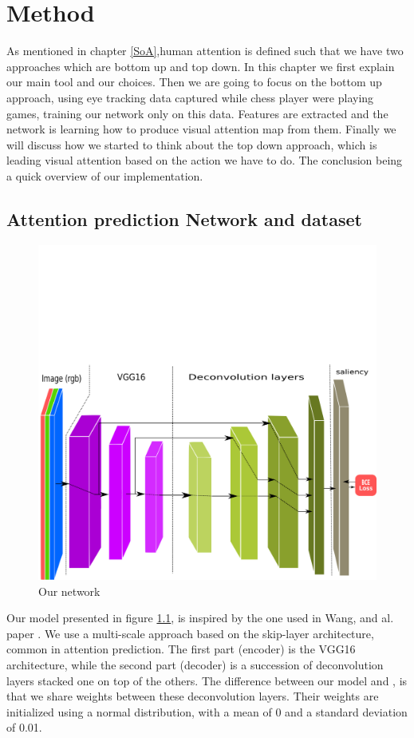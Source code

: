 \chapter{Method}
As mentioned in chapter \ref{SoA},human attention is defined such that we have two approaches which are bottom up and top down. 
In this chapter we first explain our main tool and our choices.
Then we are going to focus on the bottom up approach, using eye tracking data captured while chess player were playing games, training our network only on this data. Features are extracted and the network is learning how to produce visual attention map from them. 
Finally we will discuss how we started to think about the top down approach, which is leading visual attention based on the action we have to do. The conclusion being a quick overview of our implementation.


\section{Attention prediction Network and dataset}\label{section:model}
\begin{figure}[h!]
 \centerline{\includegraphics[scale=0.40]{./pics/network.png}}
 \caption{Our network}
 \label{fig:network}
\end{figure}
Our model presented in figure \ref{fig:network}, is inspired by the one used in Wang, and al. paper \cite{DBLP:journals/corr/WangS17b}. We use a multi-scale approach based on the skip-layer architecture, common in attention prediction. The first part (encoder) is the VGG16 \cite{DBLP:journals/corr/SimonyanZ14a} architecture, while the second part (decoder) is a succession of deconvolution layers stacked one on top of the others. The difference between our model and \cite{DBLP:journals/corr/WangS17b}, is that we share weights between these deconvolution layers. Their weights are initialized using a normal distribution, with a mean of 0 and a standard deviation of 0.01.


